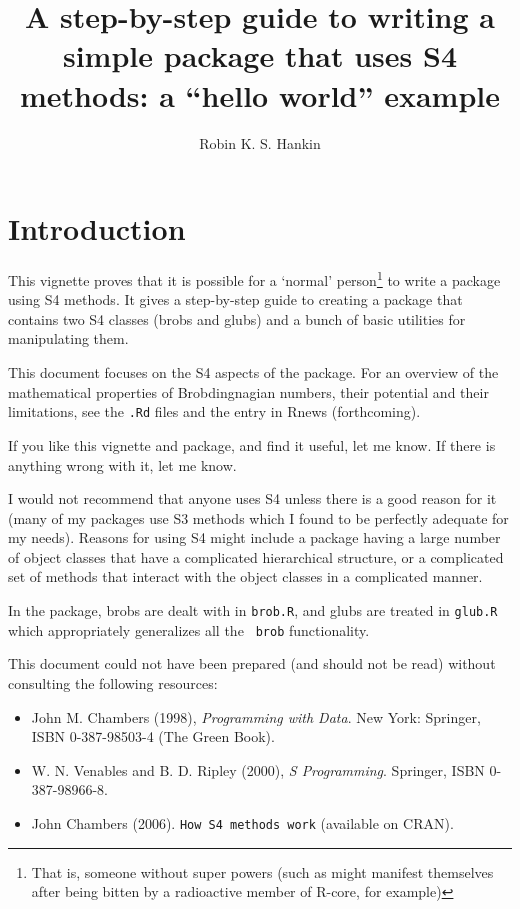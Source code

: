 \documentclass[a4paper]{article}
\author{Robin K. S. Hankin}
\title{A step-by-step guide to writing a simple package that uses S4 methods: a ``hello world'' example}
\begin{document}
\maketitle

\section{Introduction}

This vignette proves that it is possible for a `normal'
person\footnote{That is, someone without super powers (such as might
manifest themselves after being bitten by a radioactive member of
R-core, for example)} to write a package using S4 methods.  It gives a
step-by-step guide to creating a package that contains two S4 classes
(brobs and glubs) and a bunch of basic utilities for manipulating
them.

This document focuses on the S4 aspects of the package.  For an
overview of the mathematical properties of Brobdingnagian numbers,
their potential and their limitations, see the {\tt .Rd} files and the
entry in Rnews (forthcoming).

If you like this vignette and package, and find it useful, let me
know.  If there is anything wrong with it, let me know.

I would not recommend that anyone uses S4 unless there is a good
reason for it (many of my packages use S3 methods which I found to be
perfectly adequate for my needs).  Reasons for using S4 might include
a package having a large number of object classes that have a
complicated hierarchical structure, or a complicated set of methods
that interact with the object classes in a complicated manner.

In the package, brobs are dealt with in {\tt brob.R}, and glubs are
treated in {\tt glub.R} which appropriately generalizes all the {\tt
brob} functionality.

This document could not have been prepared (and should not be read)
without consulting the following resources:
\begin{itemize}
\item John M. Chambers (1998), {\it Programming with Data}.  New York: Springer,
     ISBN 0-387-98503-4 (The Green Book).
\item W. N. Venables and B. D. Ripley (2000), {\it S Programming}.  Springer,
     ISBN 0-387-98966-8.
\item John Chambers (2006).  {\tt How S4 methods work} (available on CRAN).
\end{itemize}
\end{document}
